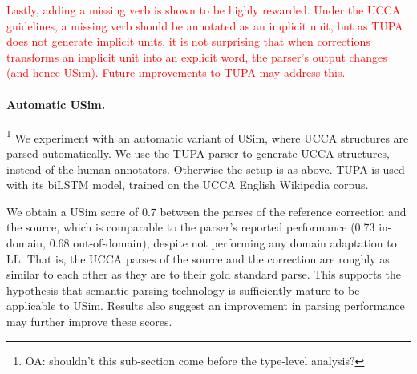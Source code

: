 \documentclass[a4paper, 11pt]{article}
\newcommand{\oa}[1]{\footnote{\color{red}OA: #1}}
\newcommand{\lc}[1]{\footnote{\color{blue}LC: #1}}
\begin{document}
\textcolor{red}{Lastly, adding a missing verb is shown to be highly rewarded. Under the UCCA guidelines, a missing verb should be annotated as an implicit unit, but as TUPA does not generate implicit units, it is not surprising that when corrections transforms an implicit unit into an explicit word, the parser's output changes (and hence {\sc USim}). Future improvements to TUPA may address this.}



\paragraph{Automatic {\sc USim}.}

\oa{shouldn't this sub-section come before the type-level analysis?}
We experiment with an automatic variant of {\sc USim}, where UCCA
structures are parsed automatically.
We use the TUPA parser \cite{hershcovich2017transition} to generate UCCA structures,
instead of the human annotators. Otherwise the setup is as above.
TUPA is used with its biLSTM model, trained on the UCCA English Wikipedia corpus.

We obtain a {\sc USim} score of 0.7 between the parses of the reference
correction and the source, which is comparable to the parser's reported
performance (0.73 in-domain, 0.68 out-of-domain), despite not performing any
domain adaptation to LL. 
That is, the UCCA parses of the source and the correction are roughly as similar to each
other as they are to their gold standard parse. This supports the hypothesis 
that semantic parsing technology is sufficiently mature to
be applicable to {\sc USim}.
Results also suggest an improvement in parsing performance may further improve these scores.

\end{document}
